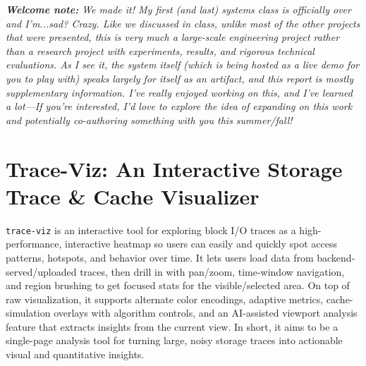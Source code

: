 \documentclass[11pt]{article}
\begin{document}
\pagestyle{fancy}
\fancyhead{}

\fancyfoot{} %

\noindent\textit{\textbf{Welcome note:} We made it!  My first (and last) systems class is officially over and I'm...sad?  Crazy.  Like we discussed in class, unlike most of the other projects that were presented, this is very much a large-scale engineering project rather than a research project with experiments, results, and rigorous technical evaluations.  As I see it, the system itself (which is being hosted as a live demo for you to play with) speaks largely for itself as an artifact, and this report is mostly supplementary information.  I've really enjoyed working on this, and I've learned a lot---If you're interested, I'd love to explore the idea of expanding on this work and potentially co-authoring something with you this summer/fall!}

\section{Trace-Viz: An Interactive Storage Trace \& Cache Visualizer}
\texttt{trace-viz} is an interactive tool for exploring block I/O traces as a high-performance, interactive heatmap so users can easily and quickly spot access patterns, hotspots, and behavior over time.  It lets users load data from backend-served/uploaded traces, then drill in with pan/zoom, time-window navigation, and region brushing to get focused stats for the visible/selected area.  On top of raw visualization, it supports alternate color encodings, adaptive metrics, cache-simulation overlays with algorithm controls, and an AI-assisted viewport analysis feature that extracts insights from the current view.  In short, it aims to be a single-page analysis tool for turning large, noisy storage traces into actionable visual and quantitative insights.
\end{document}
